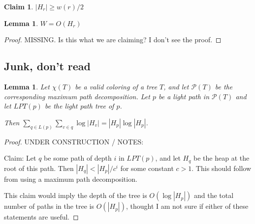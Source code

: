 \documentclass[11pt]{article}
\newtheorem{lemma}[theorem]{Lemma}
\newtheorem{claim}[theorem]{Claim}
\theoremstyle{definition}
\newcommand{\Lem}[1]{\hyperref[lem:#1]{Lemma~\ref*{lem:#1}}} %
\begin{document}
\begin{claim}
 $|H_r|\geq w(r)/2$
\end{claim}





\begin{lemma}
 $W=O(H_r)$
\end{lemma}
\begin{proof}
MISSING.  Is this what we are claiming?  I don't see the proof.
\end{proof}
%
%











\pagebreak
\subsection{Junk, don't read}

\begin{lemma}
 Let $\chi(T)$ be a valid coloring of a tree $T$, and let $\mathcal{P}(T)$ be the corresponding maximum path decomposition.
 Let $p$ be a light path in $\mathcal{P}(T)$ and let $LPT(p)$ be the light path tree of $p$.
 
 Then $\sum_{q\in L(p)} \sum_{v\in q} \log |H_v| = |H_p|\log |H_p|$.
\end{lemma}
\begin{proof}UNDER CONSTRUCTION / NOTES:

 Claim: Let $q$ be some path of depth $i$ in $LPT(p)$, and let $H_q$ be the heap at the root of this path.
 Then $|H_q|< |H_p|/c^i$ for some constant $c>1$.  This should follow from using a maximum path decomposition.
 
 This claim would imply the depth of the tree is $O(\log |H_p|)$ and the total number of paths in the tree is $O(|H_p|)$, 
 thought I am not sure if either of these statements are useful.
\end{proof}
\end{document}
